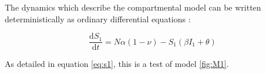 \documentclass[../Paper.tex]{subfiles}
\begin{document}
The dynamics which describe the compartmental model can be written deterministically
as ordinary differential equations :
\par
\begin{equation} \label{eq:s1}
\frac{\mathrm{d} S_{1}}{\mathrm{d} t} = N\alpha\left(1 - \nu \right) - S_{1}\left(\beta I_{1} + \theta \right)
\end{equation}
\raggedright
As detailed in equation \ref{eq:s1}, this is a test of model \ref{fig:M1}.
\clearpage
\end{document}
